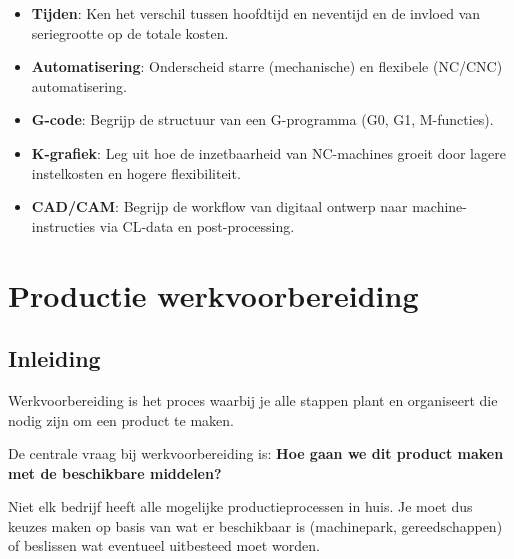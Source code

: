 \documentclass[a4paper,11pt,twoside]{report}
\begin{document}
\begin{warningbox}
    \begin{itemize}
        \item \textbf{Tijden}: Ken het verschil tussen hoofdtijd en neventijd en de invloed van seriegrootte op de totale kosten.
        \item \textbf{Automatisering}: Onderscheid starre (mechanische) en flexibele (NC/CNC) automatisering.
        \item \textbf{G-code}: Begrijp de structuur van een G-programma (G0, G1, M-functies).
        \item \textbf{K-grafiek}: Leg uit hoe de inzetbaarheid van NC-machines groeit door lagere instelkosten en hogere flexibiliteit.
        \item \textbf{CAD/CAM}: Begrijp de workflow van digitaal ontwerp naar machine-instructies via CL-data en post-processing.
    \end{itemize}
\end{warningbox}

\chapter{Productie werkvoorbereiding}
\section{Inleiding}
Werkvoorbereiding is het proces waarbij je alle stappen plant en organiseert die nodig zijn om een product te maken.

De centrale vraag bij werkvoorbereiding is: \textbf{Hoe gaan we dit product maken met de beschikbare middelen?}

Niet elk bedrijf heeft alle mogelijke productieprocessen in huis.
Je moet dus keuzes maken op basis van wat er beschikbaar is (machinepark, gereedschappen) of beslissen wat eventueel uitbesteed
moet worden.
\end{document}
